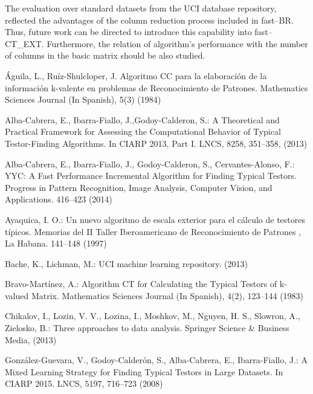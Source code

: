 \documentclass[citeauthoryear]{llncs}
\begin{document}
 The evaluation over standard datasets from the UCI database repository, reflected the advantages of the column reduction process included in fast--BR. Thus, future work can be directed to introduce this capability into fast--CT\_EXT. Furthermore, the relation of algorithm's performance with the number of columns in the basic matrix should be also studied.

%
\begin{thebibliography}{}
%

	Águila, L., Ruíz-Shulcloper, J.  
	Algoritmo CC para la elaboración de la información k-valente en problemas de Reconocimiento de Patrones. 
	Mathematics Sciences Journal (In Spanish), 
	5(3) (1984)
	
	Alba-Cabrera, E., Ibarra-Fiallo, J.,Godoy-Calderon, S.:
	A Theoretical and Practical Framework for Assessing the Computational Behavior of Typical Testor-Finding Algorithms.
	In CIARP 2013, Part I. LNCS,
	8258, 351--358, (2013)
	
	Alba-Cabrera, E., Ibarra-Fiallo, J., Godoy-Calderon, S., Cervantes-Alonso, F.:
	YYC: A Fast Performance Incremental Algorithm for Finding Typical Testors.
	Progress in Pattern Recognition, Image Analysis, Computer Vision, and Applications.
	416--423 (2014)
	
	Ayaquica, I. O.:
	Un nuevo algoritmo de escala exterior para el c\'alculo de testores t\'ipicos.
	Memorias del II Taller Iberoamericano de Reconocimiento de Patrones , La
	Habana. 141--148 (1997)
	
	Bache, K., Lichman, M.:
	UCI machine learning repository.
	(2013)
	
	Bravo-Martínez, A.:
	Algorithm CT for Calculating the Typical Testors of k-valued Matrix. 
	Mathematics Sciences Journal (In Spanish), 
	4(2), 123--144 (1983)
	
	Chikalov, I., Lozin, V. V., Lozina, I., Moshkov, M., Nguyen, H. S., Slowron, A., Zielosko, B.:
 	Three approaches to data analysis. 
 	Springer Science \& Business Media, 
 	(2013)

	González-Guevara, V., Godoy-Calderón, S., Alba-Cabrera, E.,  Ibarra-Fiallo, J.:
	A Mixed Learning Strategy for Finding Typical Testors in Large Datasets. 
	In CIARP 2015. LNCS,
	5197, 716--723 (2008)
		

\end{thebibliography}
\end{document}
